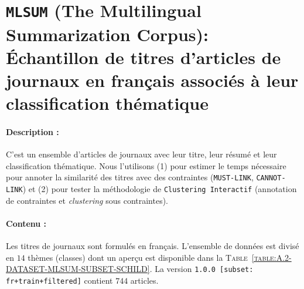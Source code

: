 	\section[
		Jeu de données \texttt{MLSUM}
	]{
		\texttt{MLSUM} (The Multilingual Summarization Corpus): Échantillon de titres d'articles de journaux en français associés à leur classification thématique
	}
	\label{annex:A.2-DATASET-MLSUM-SUBSET-SCHILD}
		
		
		\paragraph{Description :}
		C'est un ensemble d'articles de journaux avec leur titre, leur résumé et leur classification thématique.
		Nous l'utilisons (1) pour estimer le temps nécessaire pour annoter la similarité des titres avec des contraintes (\texttt{MUST-LINK}, \texttt{CANNOT-LINK}) et (2) pour tester la méthodologie de \texttt{Clustering Interactif} (annotation de contraintes et \textit{clustering} sous contraintes).
		
		\paragraph{Contenu :}
		Les titres de journaux sont formulés en français.
		L'ensemble de données est divisé en $14$ thèmes (classes) dont un aperçu est disponible dans la \textsc{Table~\ref{table:A.2-DATASET-MLSUM-SUBSET-SCHILD}}.
		La version \texttt{1.0.0 [subset: fr+train+filtered]} contient $744$ articles.
		

